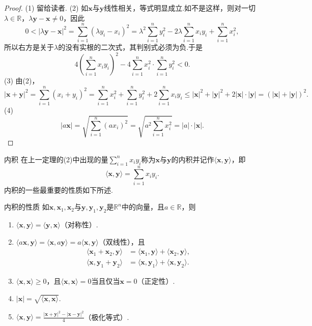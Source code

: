 \begin{proof}
    (1) 留给读者.
    (2) 如$\mathbf{x}$与$\mathbf{y}$线性相关，等式明显成立.如不是这样，则对一切$\lambda\in\mathbb{R}$，$\lambda\mathbf{y}-\mathbf{x}\neq 0$，因此
    $$0<|\lambda\mathbf{y}-\mathbf{x}|^2=\sum_{i=1}^n(\lambda y_i-x_i)^2
    =\lambda^2\sum_{i=1}^n y_i^2-2\lambda\sum_{i=1}^n x_i y_i+\sum_{i=1}^n x_i^2,$$
    所以右方是关于$\lambda$的没有实根的二次式，其判别式必须为负.于是
    $$4\left(\sum_{i=1}^n x_i y_i\right)^2-4\sum_{i=1}^n x_i^2\cdot\sum_{i=1}^n y_i^2<0.$$
    (3) 由(2)，
    $$|\mathbf{x}+\mathbf{y}|^2=\sum_{i=1}^n(x_i+y_i)^2
    =\sum_{i=1}^n x_i^2+\sum_{i=1}^n y_i^2+2\sum_{i=1}^n x_i y_i
    \leqslant|\mathbf{x}|^2+|\mathbf{y}|^2+2|\mathbf{x}|\cdot|\mathbf{y}|
    =(|\mathbf{x}|+|\mathbf{y}|)^2.$$
    (4)
    $$|a\mathbf{x}|=\sqrt{\sum_{i=1}^n(a x_i)^2}
    =\sqrt{a^2\sum_{i=1}^n x_i^2}=|a|\cdot|\mathbf{x}|.$$
\end{proof}

\begin{mydefinition}{内积}
    在上一定理的(2)中出现的量$\sum_{i=1}^n x_i y_i$称为$\mathbf{x}$与$\mathbf{y}$的内积并记作$\langle\mathbf{x},\mathbf{y}\rangle$，即
    $$\langle\mathbf{x},\mathbf{y}\rangle=\sum_{i=1}^n x_i y_i.$$
    内积的一些最重要的性质如下所述.
\end{mydefinition}

\begin{myTheorem}{内积的性质}
    如$\mathbf{x},\mathbf{x}_1,\mathbf{x}_2$与$\mathbf{y},\mathbf{y}_1,\mathbf{y}_2$是$\mathbb{R}^n$中的向量，且$a\in\mathbb{R}$，则
    \begin{enumerate}
        \item $\langle\mathbf{x},\mathbf{y}\rangle=\langle\mathbf{y},\mathbf{x}\rangle$（对称性）.
        \item $\langle a\mathbf{x},\mathbf{y}\rangle=\langle\mathbf{x},a\mathbf{y}\rangle=a\langle\mathbf{x},\mathbf{y}\rangle$（双线性），且
        \begin{align*}
            \langle\mathbf{x}_1+\mathbf{x}_2,\mathbf{y}\rangle&=\langle\mathbf{x}_1,\mathbf{y}\rangle+\langle\mathbf{x}_2,\mathbf{y}\rangle,\\
            \langle\mathbf{x},\mathbf{y}_1+\mathbf{y}_2\rangle&=\langle\mathbf{x},\mathbf{y}_1\rangle+\langle\mathbf{x},\mathbf{y}_2\rangle.
        \end{align*}
        \item $\langle\mathbf{x},\mathbf{x}\rangle\geqslant 0$，且$\langle\mathbf{x},\mathbf{x}\rangle=0$当且仅当$\mathbf{x}=0$（正定性）.
        \item $|\mathbf{x}|=\sqrt{\langle\mathbf{x},\mathbf{x}\rangle}$.
        \item $\langle\mathbf{x},\mathbf{y}\rangle=\frac{|\mathbf{x}+\mathbf{y}|^2-|\mathbf{x}-\mathbf{y}|^2}{4}$（极化等式）.
    \end{enumerate}
\end{myTheorem}

